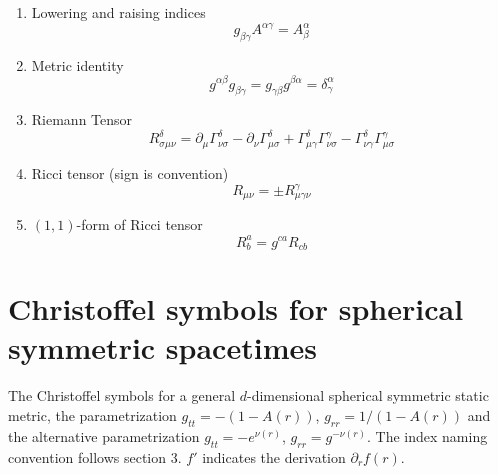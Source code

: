 \documentclass[12pt,a4paper]{report}
\numberwithin{equation}{chapter}
\newcommand{\tinysection}[1]{%
\addtocounter{section}{1}%
\setcounter{subsection}{0}%
\addcontentsline{toc}{section}{\protect\numberline{\thesection} #1}
\subsection*{\thesection\quad{} #1}}
\begin{document}
\begin{appendices}
\begin{enumerate}
\item Lowering and raising indices
\begin{equation}
g_{\beta \gamma} A^{\alpha \gamma} = A^\alpha_\beta
\end{equation}

\item Metric identity
\begin{equation}
g^{\alpha\beta} g_{\beta\gamma} = 
g_{\gamma\beta} g^{\beta\alpha} =
\delta^\alpha_\gamma
\end{equation}

\item Riemann Tensor
\begin{equation}
R^\delta_{\sigma\mu\nu} =
\partial_\mu \Gamma^\delta_{\nu\sigma} -
\partial_\nu \Gamma^\delta_{\mu\sigma} +
\Gamma^\delta_{\mu\gamma} \Gamma^\gamma_{\nu\sigma} -
\Gamma^\delta_{\nu\gamma} \Gamma^\gamma_{\mu\sigma}
\end{equation}

\item Ricci tensor (sign is convention)
\begin{equation}
R_{\mu\nu} = \pm R^\gamma_{\mu \gamma \nu}
\end{equation}

\item $(1,1)$-form of Ricci tensor
\begin{equation}
R^a_b = g^{c a} R_{c b}
\end{equation}

\end{enumerate}

\section{Christoffel symbols for spherical symmetric spacetimes}\label{sec:apx-christoffels}
The Christoffel symbols for a general $d$-dimensional spherical symmetric static metric, the parametrization $g_{tt}=-(1-A(r))$, $g_{rr}=1/(1-A(r))$ and the alternative parametrization $g_{tt}=-e^{\nu(r)}$, $g_{rr}=g^{-\nu(r)}$. The index naming convention follows section 3. $f'$ indicates the derivation $\partial_r f(r)$.


\end{appendices}
\end{document}

